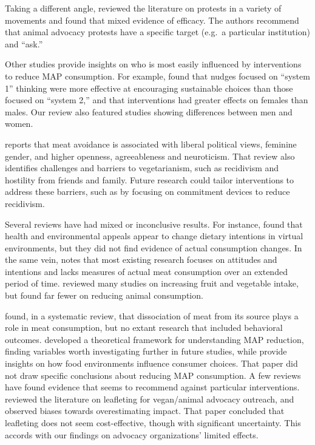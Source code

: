 \documentclass[sn-nature,pdflatex]{sn-jnl}
\begin{document}
Taking a different angle, \citep{adleberg2018} reviewed the literature
on protests in a variety of movements and found that mixed evidence of
efficacy. The authors recommend that animal advocacy protests have a
specific target (e.g.~a particular institution) and ``ask.''

Other studies provide insights on who is most easily influenced by
interventions to reduce MAP consumption. For example,
\citep{blackford2021} found that nudges focused on ``system 1'' thinking
were more effective at encouraging sustainable choices than those
focused on ``system 2,'' and that interventions had greater effects on
females than males. Our review also featured studies showing differences
between men and women.

\citep{rosenfeld2018} reports that meat avoidance is associated with
liberal political views, feminine gender, and higher openness,
agreeableness and neuroticism. That review also identifies challenges
and barriers to vegetarianism, such as recidivism and hostility from
friends and family. Future research could tailor interventions to
address these barriers, such as by focusing on commitment devices to
reduce recidivism.

Several reviews have had mixed or inconclusive results. For instance,
\citep{bianchi2018conscious} found that health and environmental appeals
appear to change dietary intentions in virtual environments, but they
did not find evidence of actual consumption changes. In the same vein,
\citep{kwasny2022} notes that most existing research focuses on
attitudes and intentions and lacks measures of actual meat consumption
over an extended period of time. \citep{taufik2019} reviewed many
studies on increasing fruit and vegetable intake, but found far fewer on
reducing animal consumption.

\citep{benningstad2020} found, in a systematic review, that dissociation
of meat from its source plays a role in meat consumption, but no extant
research that included behavioral outcomes. \citep{graca2019} developed
a theoretical framework for understanding MAP reduction, finding
variables worth investigating further in future studies, while
\citep{pitt2017} provide insights on how food environments influence
consumer choices. That paper did not draw specific conclusions about
reducing MAP consumption. A few reviews have found evidence that seems
to recommend against particular interventions. \citep{greig2017}
reviewed the literature on leafleting for vegan/animal advocacy
outreach, and observed biases towards overestimating impact. That paper
concluded that leafleting does not seem cost-effective, though with
significant uncertainty. This accords with our findings on advocacy
organizations' limited effects.
\end{document}
